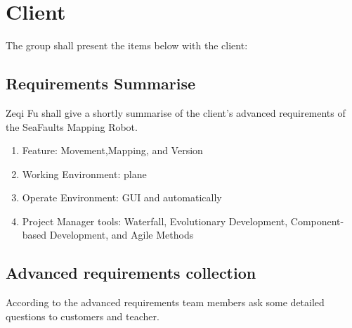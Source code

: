 \documentclass[11pt, a4paper]{article}
\begin{document}


\section{Client}

The group shall present the items below with the client:




\subsection{Requirements Summarise }

Zeqi Fu shall give a shortly summarise of the client's advanced requirements of the SeaFaults Mapping Robot. 



\begin{enumerate}

\item Feature: Movement,Mapping, and Version

\item Working Environment: plane

\item Operate Environment: GUI and automatically

\item Project Manager tools: Waterfall, Evolutionary Development, Component-based Development, and Agile Methods

\end{enumerate}



\subsection{Advanced requirements collection}

According to the advanced requirements team members ask some detailed questions to customers and teacher.
\end{document}
